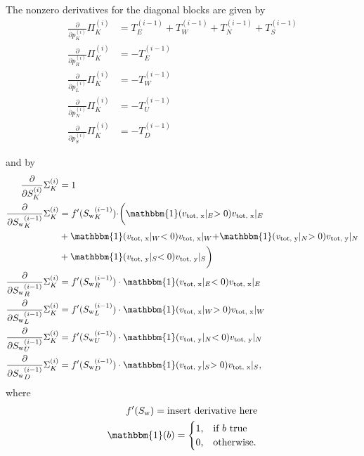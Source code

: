 \documentclass[conference]{IEEEtran}
\newcommand*{\indicator}{\ensuremath{\mathbb{1}}}
\newcommand*{\pdiff}[2]{\ensuremath{\frac{\partial}{\partial{#2}}{#1}}}
\renewcommand*{\indicator}{\ensuremath{\mathbbm{1}}}
\begin{document}
The nonzero derivatives for the diagonal blocks are given by
\begin{align}
\pdiff{\Pi_K^{(i)}}{p_K^{(i)}} &= T_E^{(i-1)} + T_W^{(i-1)} + T_N^{(i-1)} + T_S^{(i-1)} \\
\pdiff{\Pi_K^{(i)}}{p_R^{(i)}} &= -T_E^{(i-1)} \\
\pdiff{\Pi_K^{(i)}}{p_L^{(i)}} &= -T_W^{(i-1)} \\
\pdiff{\Pi_K^{(i)}}{p_N^{(i)}} &= -T_U^{(i-1)} \\
\pdiff{\Pi_K^{(i)}}{p_S^{(i)}} &= -T_D^{(i-1)}
\end{align}

and by
\begin{align}
\pdiff{\Sigma_K^{(i)}}{S_K^{(i)}} &= 1 \\
\pdiff{\Sigma_K^{(i)}}{{S_{\text{w}}}_K^{(i-1)}} &= f^\prime({S_{\text{w}}}_K^{(i-1)}) \cdot \biggr(\indicator(v_\text{tot, x}\lvert_E > 0) v_\text{tot, x}\lvert_E \\& + \indicator(v_\text{tot, x}\lvert_W < 0) v_\text{tot, x}\lvert_W + \indicator(v_\text{tot, y}\lvert_N > 0) v_\text{tot, y}\lvert_N \\&+ \indicator(v_\text{tot, y}\lvert_S < 0) v_\text{tot, y}\lvert_S\biggr) \\ 
\pdiff{\Sigma_K^{(i)}}{{S_{\text{w}}}_R^{(i-1)}} &= f^\prime({S_{\text{w}}}_R^{(i-1)}) \cdot \indicator(v_\text{tot, x}\lvert_E < 0) v_\text{tot, x}\lvert_E \\
\pdiff{\Sigma_K^{(i)}}{{S_{\text{w}}}_L^{(i-1)}} &= f^\prime({S_{\text{w}}}_L^{(i-1)}) \cdot \indicator(v_\text{tot, x}\lvert_W > 0) v_\text{tot, x}\lvert_W \\
\pdiff{\Sigma_K^{(i)}}{{S_{\text{w}}}_U^{(i-1)}} &= f^\prime({S_{\text{w}}}_U^{(i-1)}) \cdot \indicator(v_\text{tot, y}\lvert_N < 0) v_\text{tot, y}\lvert_N \\
\pdiff{\Sigma_K^{(i)}}{{S_{\text{w}}}_D^{(i-1)}} &= f^\prime({S_{\text{w}}}_D^{(i-1)}) \cdot \indicator(v_\text{tot, y}\lvert_S > 0) v_\text{tot, x}\lvert_S,
\end{align}
where
\begin{align}
f^\prime(S_\text{w}) = \text{insert derivative here} \\
\indicator(b) = \begin{cases} 1, &\text{if } b \text{ true} \\ 0, &\text{otherwise.}
\end{cases}
\end{align}



%
%
\end{document}
